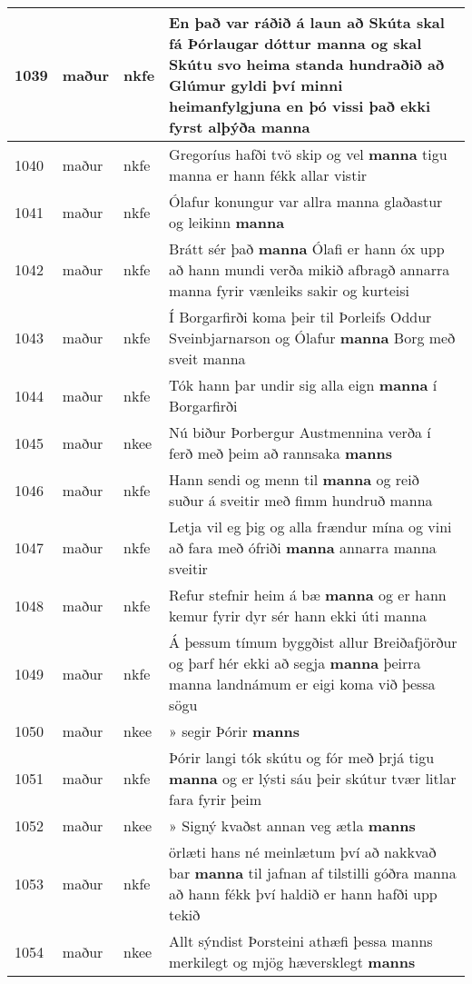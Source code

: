 \documentclass{article}
\begin{document}
\begin{longtable}{p{1cm}|p{1cm}|p{1cm}|p{13cm}}
\hline
1039&maður&nkfe&En það var ráðið á laun að Skúta skal fá Þórlaugar dóttur \textbf{manna} og skal Skútu svo heima standa hundraðið að Glúmur gyldi því minni heimanfylgjuna en þó vissi það ekki fyrst alþýða manna\\
\hline
1040&maður&nkfe&Gregoríus hafði tvö skip og vel \textbf{manna} tigu manna er hann fékk allar vistir\\
\hline
1041&maður&nkfe&Ólafur konungur var allra manna glaðastur og leikinn \textbf{manna} \\
\hline
1042&maður&nkfe&Brátt sér það \textbf{manna} Ólafi er hann óx upp að hann mundi verða mikið afbragð annarra manna fyrir vænleiks sakir og kurteisi\\
\hline
1043&maður&nkfe&Í Borgarfirði koma þeir til Þorleifs Oddur Sveinbjarnarson og Ólafur \textbf{manna} Borg með sveit manna\\
\hline
1044&maður&nkfe&Tók hann þar undir sig alla eign \textbf{manna} í Borgarfirði\\
\hline
1045&maður&nkee&Nú biður Þorbergur Austmennina verða í ferð með þeim að rannsaka \textbf{manns} \\
\hline
1046&maður&nkfe&Hann sendi og menn til \textbf{manna} og reið suður á sveitir með fimm hundruð manna\\
\hline
1047&maður&nkfe&Letja vil eg þig og alla frændur mína og vini að fara með ófriði \textbf{manna} annarra manna sveitir\\
\hline
1048&maður&nkfe&Refur stefnir heim á bæ \textbf{manna} og er hann kemur fyrir dyr sér hann ekki úti manna\\
\hline
1049&maður&nkfe&Á þessum tímum byggðist allur Breiðafjörður og þarf hér ekki að segja \textbf{manna} þeirra manna landnámum er eigi koma við þessa sögu\\
\hline
1050&maður&nkee&» segir Þórir \textbf{manns} \\
\hline
1051&maður&nkfe&Þórir langi tók skútu og fór með þrjá tigu \textbf{manna} og er lýsti sáu þeir skútur tvær litlar fara fyrir þeim\\
\hline
1052&maður&nkee&» Signý kvaðst annan veg ætla \textbf{manns} \\
\hline
1053&maður&nkfe&örlæti hans né meinlætum því að nakkvað bar \textbf{manna} til jafnan af tilstilli góðra manna að hann fékk því haldið er hann hafði upp tekið\\
\hline
1054&maður&nkee&Allt sýndist Þorsteini athæfi þessa manns merkilegt og mjög hæversklegt \textbf{manns} \\

\end{longtable}
\end{document}
